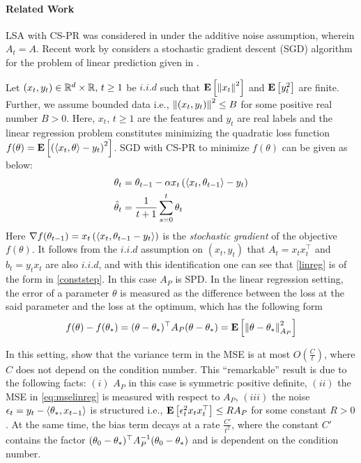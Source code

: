 \paragraph{Related Work}
LSA with CS-PR was considered in \cite{polyak-judisky} under the additive noise assumption, wherein $A_t=A$. Recent work by \cite{bach} considers a stochastic gradient descent (SGD) algorithm for the problem of linear prediction given in .
\begin{example}\label{ex:linreg}
Let $(x_t,y_t)\in \mathbb{R}^d\times \mathbb{R},\,t\geq 1$ be $i.i.d$ such that $\mathbf{E}\left[\left\| x_t\right\|^2\right]$ and $\mathbf{E}\left[y_t^2\right]$ are finite. Further, we assume bounded data i.e., $\left\| (x_t,y_t)\right\|^2\leq B$ for some positive real number $B>0$. Here, $x_t,\,t\geq 1$ are the features and $y_t$ are real labels and the linear regression problem constitutes minimizing the quadratic loss function $f(\theta)=\mathbf{E}\left[\left(\langle x_t,\theta\rangle-y_t\right)^2\right]$. SGD with CS-PR to minimize $f(\theta)$ can be given as below:
\begin{subequations}\label{eq:linreg}
\begin{align}
\theta_t&=\theta_{t-1}-\alpha x_t\left(\langle x_t,\theta_{t-1}\rangle -y_t\right)\\
\hat{\theta}_t&=\frac{1}{t+1}\sum_{s=0}^t \theta_t
\end{align}
\end{subequations}
Here $\nabla f(\theta_{t-1})=x_t\left(\langle x_t,\theta_{t-1} -y_t\rangle\right)$ is the \emph{stochastic gradient} of the objective $f(\theta)$. It follows from the $i.i.d$ assumption on $(x_t,y_t)$ that $A_t=x_t x_t^\top$ and $b_t=y_t x_t$ are also $i.i.d$, and with this identification one can see that \eqref{linreg} is of the form in \eqref{conststep}. In this case $A_P$ is SPD.
In the linear regression setting, the error of a parameter $\theta$ is measured as the difference between the loss at the said parameter and the loss at the optimum, which has the following form
\begin{align}\label{eq:mselinreg}
f(\theta)-f(\theta_*)=(\theta-\theta_*)^\top A_P (\theta-\theta_*)=\mathbf{E}\left[\left\| \theta-\theta_*\right\|^2_{A_P}\right]
\end{align}
\end{example}
In this setting, \cite{bach} show that the variance term in the MSE is at most $O(\frac{C}{t})$, where $C$ does not depend on the condition number. This ``remarkable'' result is due to the following facts: $(i)$ $A_P$ in this case is symmetric positive definite, $(ii)$ the MSE in \eqref{eq:mselinreg} is measured with respect to $A_P$, $(iii)$ the noise $\epsilon_t=y_t-\langle\theta_*,x_{t-1}\rangle$ is structured i.e., $\mathbf{E}\left[\epsilon_t^2 x_t x_t^\top\right]\leq R A_P$ for some constant $R>0$.
At the same time, the bias term decays at a rate $\frac{C'}{t^2}$, where the constant $C'$ contains the factor $(\theta_0-\theta_*)^\top A^{-1}_P (\theta_0-\theta_*)$ and is dependent on the condition number.
